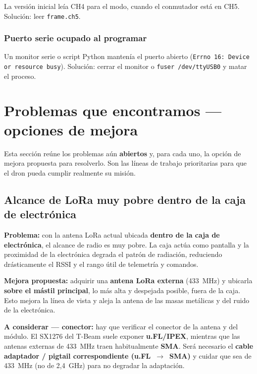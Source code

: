\documentclass[12pt,a4paper]{article}
\begin{document}
La versi\'on inicial le\'ia CH4 para el modo, cuando el conmutador est\'a en CH5.
Soluci\'on: leer \texttt{frame.ch5}.

\subsubsection{Puerto serie ocupado al programar}

Un monitor serie o script Python manten\'ia el puerto abierto
(\texttt{Errno 16: Device or resource busy}). Soluci\'on: cerrar el monitor o
\texttt{fuser /dev/ttyUSB0} y matar el proceso.

\section{Problemas que encontramos --- opciones de mejora}
\label{sec:abiertos}

Esta secci\'on re\'une los problemas a\'un \textbf{abiertos} y, para cada uno, la
opci\'on de mejora propuesta para resolverlo. Son las l\'ineas de trabajo
prioritarias para que el dron pueda cumplir realmente su misi\'on.

\subsection{Alcance de LoRa muy pobre dentro de la caja de electr\'onica}

\begin{warningbox}
  \textbf{Problema:} con la antena LoRa actual ubicada \textbf{dentro de la caja de
  electr\'onica}, el alcance de radio es muy pobre. La caja act\'ua como pantalla y
  la proximidad de la electr\'onica degrada el patr\'on de radiaci\'on, reduciendo
  dr\'asticamente el RSSI y el rango \'util de telemetr\'ia y comandos.
\end{warningbox}

\begin{okbox}
  \textbf{Mejora propuesta:} adquirir una \textbf{antena LoRa externa} (433~MHz) y
  ubicarla \textbf{sobre el m\'astil principal}, lo m\'as alta y despejada posible,
  fuera de la caja. Esto mejora la l\'inea de vista y aleja la antena de las masas
  met\'alicas y del ruido de la electr\'onica.

  \textbf{A considerar --- conector:} hay que verificar el conector de la antena y
  del m\'odulo. El SX1276 del T-Beam suele exponer \textbf{u.FL/IPEX}, mientras que
  las antenas externas de 433~MHz traen habitualmente \textbf{SMA}. Ser\'a
  necesario el \textbf{cable adaptador / pigtail correspondiente (u.FL~$\to$~SMA)} y
  cuidar que sea de 433~MHz (no de 2,4~GHz) para no degradar la adaptaci\'on.
\end{okbox}
\end{document}
